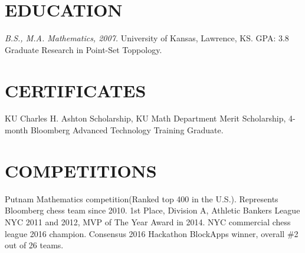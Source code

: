 \documentclass[margin]{res}
\begin{document}
\begin{resume}
\section{EDUCATION} 
		{\sl B.S., M.A. Mathematics, 2007. } University of Kansas, Lawrence, KS. GPA: 3.8  \\
		    Graduate Research in Point-Set Toppology.
\section{CERTIFICATES} 
            KU Charles H. Ashton Scholarship, KU Math Department Merit Scholarship, 4-month Bloomberg Advanced Technology Training Graduate.
\section{COMPETITIONS}
         Putnam Mathematics competition(Ranked top 400 in the U.S.). Represents Bloomberg chess team since 2010. 1st Place, Division A, Athletic Bankers League NYC 2011 and 2012, MVP of The Year Award in 2014. NYC commercial chess league 2016 champion. Consensus 2016 Hackathon BlockApps winner, overall \#2 out of 26 teams.
\end{resume}
\end{document}
